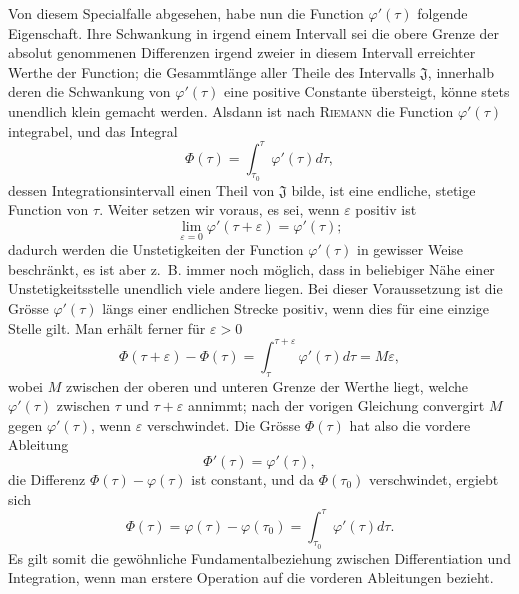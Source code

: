 \documentclass[11pt,a4paper,leqno]{article}
\begin{document}
Von diesem Specialfalle abgesehen, habe nun die Function $\varphi'(\tau)$ folgende Eigenschaft. Ihre Schwankung in irgend einem Intervall sei die obere Grenze der absolut genommenen Differenzen irgend zweier in diesem Intervall erreichter Werthe der Function; die Gesammtlänge aller Theile des Intervalls $\mathfrak{J}$, innerhalb deren die Schwankung von $\varphi'(\tau)$ eine positive Constante übersteigt,
könne stets unendlich klein gemacht werden. Alsdann ist nach \textsc{Riemann} die Function $\varphi'(\tau)$ integrabel, und das Integral
\[
\Phi(\tau)=\int_{\tau_0}^{\tau}\varphi'(\tau)d\tau,
\]
dessen Integrationsintervall einen Theil von $\mathfrak{J}$ bilde, ist eine endliche, stetige Function von $\tau$. Weiter setzen wir voraus, es sei, wenn $\varepsilon$ positiv ist
\[
\lim_{\varepsilon=0}\varphi'(\tau+\varepsilon)=\varphi'(\tau);
\]
dadurch werden die Unstetigkeiten der Function $\varphi'(\tau)$ in gewisser Weise beschränkt, es ist aber z.~B. immer noch möglich, dass in beliebiger Nähe einer Unstetigkeitsstelle unendlich viele andere liegen. Bei dieser Voraussetzung ist die Grösse $\varphi'(\tau)$ längs einer endlichen Strecke positiv, wenn dies für eine einzige Stelle gilt. Man erhält ferner für $\varepsilon>0$
\[
\Phi(\tau+\varepsilon)-\Phi(\tau)
=\int_{\tau}^{\tau+\varepsilon}\varphi'(\tau)d\tau=M\varepsilon,
\]
wobei $M$ zwischen der oberen und unteren Grenze der Werthe liegt, welche $\varphi'(\tau)$ zwischen $\tau$ und $\tau+\varepsilon$ annimmt; nach der vorigen Gleichung convergirt $M$ gegen $\varphi'(\tau)$, wenn $\varepsilon$ verschwindet. Die Grösse $\Phi(\tau)$ hat also die vordere Ableitung
\[
\Phi'(\tau)=\varphi'(\tau),
\]
die Differenz $\Phi(\tau)-\varphi(\tau)$ ist constant, und da $\Phi(\tau_0)$ verschwindet, ergiebt sich
\[
\Phi(\tau)=\varphi(\tau)-\varphi(\tau_0)=\int_{\tau_0}^{\tau}\varphi'(\tau)d\tau.
\]
Es gilt somit die gewöhnliche Fundamentalbeziehung zwischen Differentiation und Integration, wenn man erstere Operation auf die vorderen Ableitungen bezieht.
\end{document}
